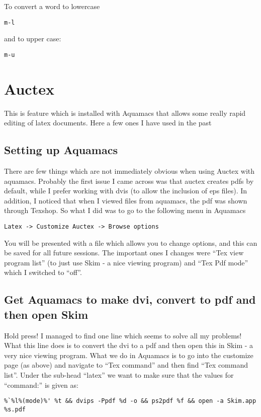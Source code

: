 \documentclass[a4paper, 10pt]{article}
\begin{document}
To convert a word to lowercase
\begin{verbatim}
m-l
\end{verbatim}
and to upper case:
\begin{verbatim}
m-u
\end{verbatim}

 \section*{Auctex}
 
This is feature which is installed with Aquamacs that allows some really rapid editing of latex documents. Here a few ones I have used in the past

\subsection*{Setting up Aquamacs}
There are few things which are not immediately obvious when using Auctex with aquamacs. Probably the first issue I came across was that auctex creates pdfs by default, while I prefer working with dvis (to allow the inclusion of eps files). In addition, I noticed that when I viewed files from aquamacs, the pdf was shown through Texshop. So what I did was to go to the following menu in Aquamacs
\begin{verbatim}
Latex -> Customize Auctex -> Browse options
\end{verbatim}
You will be presented with a file which allows you to change options, and this can be saved for all future sessions. The important ones I changes were ``Tex view program list'' (to just use Skim - a nice viewing program) and ``Tex Pdf mode'' which I switched to ``off''.

\subsection*{Get Aquamacs to make dvi, convert to pdf and then open Skim}
Hold press! I managed to find one line which seems to solve all my problems! What this line does is to convert the dvi to a pdf and then open this in Skim - a very nice viewing program. What we do in Aquamacs is to go into the customize page (as above) and navigate to ``Tex command'' and then find ``Tex command list''.  Under the sub-head ``latex'' we want to make sure that the values for ``command:'' is given as:
\begin{verbatim}
%`%l%(mode)%' %t && dvips -Ppdf %d -o && ps2pdf %f && open -a Skim.app %s.pdf
\end{verbatim}
\end{document}
